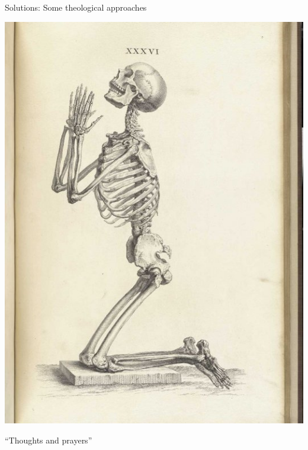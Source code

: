 \documentclass{hertieteaching}
\begin{document}
%
%
%
%



\begin{frame}{Solutions: Some theological approaches}

\pause

\centerline{\includegraphics[scale=0.5]{pictures/praying-skeleton}}

\centerline{``Thoughts and prayers''}

\end{frame}
\end{document}
